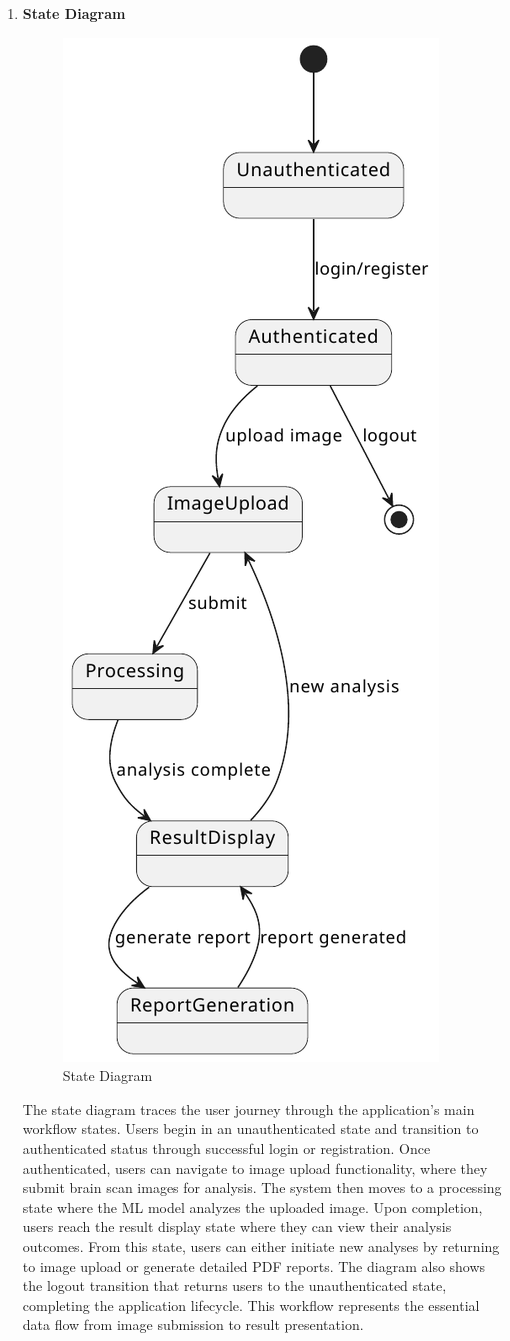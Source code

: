 \begin{enumerate}[label=\roman*.]
          \newpage
    \item \textbf{State Diagram}
          \begin{center}
              \begin{figure}[H]
                  \centering
                  \includegraphics[width=0.35\linewidth]{Images/Highlevel/state.pdf}
                  \caption{State Diagram}
                  \label{fig:StateDiagram}
              \end{figure}
          \end{center}
          The state diagram traces the user journey through the application's main workflow states. Users begin in an unauthenticated state and transition to authenticated status through successful login or registration. Once authenticated, users can navigate to image upload functionality, where they submit brain scan images for analysis. The system then moves to a processing state where the ML model analyzes the uploaded image. Upon completion, users reach the result display state where they can view their analysis outcomes. From this state, users can either initiate new analyses by returning to image upload or generate detailed PDF reports. The diagram also shows the logout transition that returns users to the unauthenticated state, completing the application lifecycle. This workflow represents the essential data flow from image submission to result presentation.



\end{enumerate}
